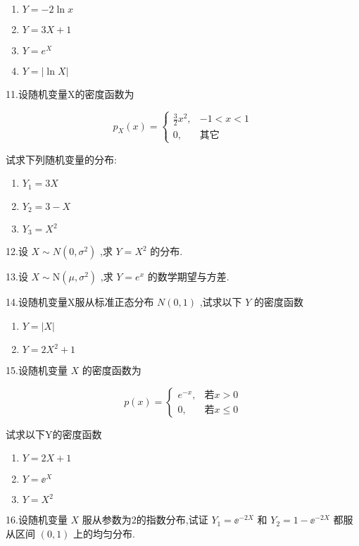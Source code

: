 \begin{enumerate}
	\item $ Y=-2\ln x $ 
	\item $ Y=3X+1 $ 
	\item $ Y=e^{X} $ 
	\item $ Y=|\ln X| $ 
\end{enumerate}

11.设随机变量X的密度函数为

\[
p_{X}(x)=\left\{
\begin{array}{ll}
{\frac{3}{2} x^{2},} & {-1<x<1} \\ 
{0,} & {\text{其它}}
\end{array}\right.
\]

试求下列随机变量的分布:

\begin{enumerate}
	\item $ Y_{1}=3 X $ 
	\item $ Y_{2}=3-X $ 
	\item $ Y_{3}=X^{2} $ 
\end{enumerate}

12.设 $ X \sim N\left(0, \sigma^{2}\right) $ ,求 $ Y=X^{2} $ 的分布.

13.设 $ X \sim \mathrm{N}\left(\mu, \sigma^{2}\right) $ ,求 $ Y=e^{x} $ 的数学期望与方差.

14.设随机变量X服从标准正态分布 $ N(0,1) $ ,试求以下 $ Y $ 的密度函数

\begin{enumerate}
	\item $ Y=|X| $ 
	\item $ Y=2 X^{2}+1 $ 
\end{enumerate}

15.设随机变量 $ X $ 的密度函数为

\[
p(x)=\left\{
\begin{array}{ll}
{e^{-x},} & {\text{若} x>0} \\ 
{0,} & {\text{若} x \leqslant 0}
\end{array}\right.
\]

试求以下Y的密度函数
\begin{enumerate}
	\item $ Y=2 X+1 $ 
	\item $ Y=\ee ^{X} $ 
	\item $ Y=X^{2} $ 
\end{enumerate}

16.设随机变量 $ X $ 服从参数为2的指数分布,试证 $ Y_{1}=\ee ^{-2 X} $ 和 $ Y_{2}=1-\ee ^{-2 X} $ 都服从区间 $ (0,1) $ 上的均匀分布.

